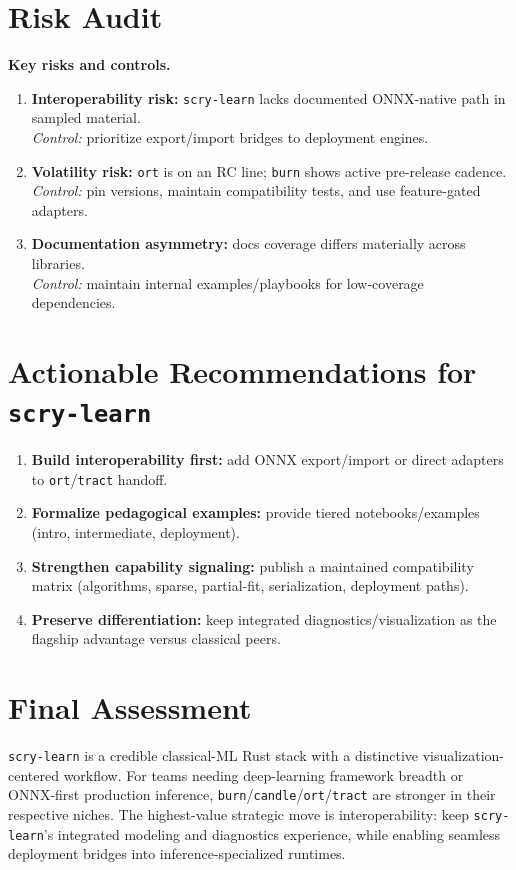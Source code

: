 \documentclass[11pt]{article}
\begin{document}
\section{Risk Audit}
\textbf{Key risks and controls.}
\begin{enumerate}[leftmargin=1.4em]
\item \textbf{Interoperability risk:} \texttt{scry-learn} lacks documented ONNX-native path in sampled material.\\
\textit{Control:} prioritize export/import bridges to deployment engines.
\item \textbf{Volatility risk:} \texttt{ort} is on an RC line; \texttt{burn} shows active pre-release cadence.\\
\textit{Control:} pin versions, maintain compatibility tests, and use feature-gated adapters.
\item \textbf{Documentation asymmetry:} docs coverage differs materially across libraries.\\
\textit{Control:} maintain internal examples/playbooks for low-coverage dependencies.
\end{enumerate}

\section{Actionable Recommendations for \texttt{scry-learn}}
\begin{enumerate}[leftmargin=1.4em]
\item \textbf{Build interoperability first:} add ONNX export/import or direct adapters to \texttt{ort}/\texttt{tract} handoff.
\item \textbf{Formalize pedagogical examples:} provide tiered notebooks/examples (intro, intermediate, deployment).
\item \textbf{Strengthen capability signaling:} publish a maintained compatibility matrix (algorithms, sparse, partial-fit, serialization, deployment paths).
\item \textbf{Preserve differentiation:} keep integrated diagnostics/visualization as the flagship advantage versus classical peers.
\end{enumerate}

\section{Final Assessment}
\texttt{scry-learn} is a credible classical-ML Rust stack with a distinctive visualization-centered workflow. For teams needing deep-learning framework breadth or ONNX-first production inference, \texttt{burn}/\texttt{candle}/\texttt{ort}/\texttt{tract} are stronger in their respective niches. The highest-value strategic move is interoperability: keep \texttt{scry-learn}'s integrated modeling and diagnostics experience, while enabling seamless deployment bridges into inference-specialized runtimes.
\end{document}
